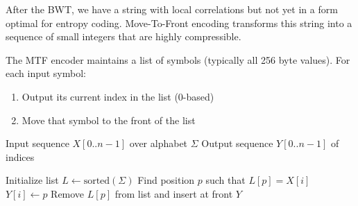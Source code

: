 After the BWT, we have a string with local correlations but not yet in a form optimal for entropy coding. Move-To-Front encoding transforms this string into a sequence of small integers that are highly compressible.

\begin{definitionbox}
The MTF encoder maintains a list of symbols (typically all 256 byte values). For each input symbol:
\begin{enumerate}
    \item Output its current index in the list (0-based)
    \item Move that symbol to the front of the list
\end{enumerate}
\end{definitionbox}

\begin{algorithm}[H]
\caption{Move-To-Front Encoding}
\begin{algorithmic}[1]
\Require Input sequence \(X[0..n-1]\) over alphabet \(\Sigma\)
\Ensure Output sequence \(Y[0..n-1]\) of indices

\State Initialize list \(L \gets \text{sorted}(\Sigma)\) 
    \State Find position \(p\) such that \(L[p] = X[i]\)
    \State \(Y[i] \gets p\)
    \State Remove \(L[p]\) from list and insert at front
\EndFor
\State \Return \(Y\)
\end{algorithmic}
\end{algorithm}

